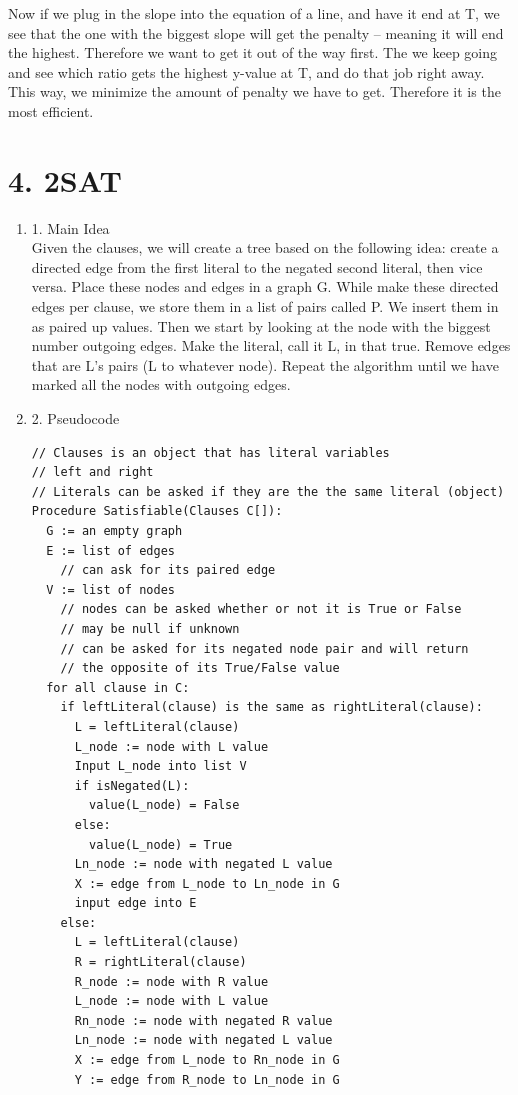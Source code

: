 \documentclass[11pt]{article}
\newenvironment{qparts}{\begin{enumerate}[{(}a{)}]}{\end{enumerate}}
\begin{document}
Now if we plug in the slope into the equation of a line, and have it end at T, we see that the one with the biggest slope will get the penalty -- meaning it will end the highest. Therefore we want to get it out of the way first. The we keep going and see which ratio gets the highest y-value at T, and do that job right away. This way, we minimize the amount of penalty we have to get. Therefore it is the most efficient. 
\newpage
\section*{4. 2SAT}
\begin{qparts}
\item[1.] Main Idea \\
Given the clauses, we will create a tree based on the following idea: create a directed edge from the first literal to the negated second literal, then vice versa. Place these nodes and edges in a graph G. While make these directed edges per clause, we store them in a list of pairs called P. We insert them in as paired up values. Then we start by looking at the node with the biggest number outgoing edges. Make the literal, call it L, in that true. Remove edges that are L's pairs (L to whatever node). Repeat the algorithm until we have marked all the nodes with outgoing edges. 
\item[2.] Pseudocode
\begin{verbatim}
// Clauses is an object that has literal variables
// left and right 
// Literals can be asked if they are the the same literal (object)
Procedure Satisfiable(Clauses C[]):
  G := an empty graph
  E := list of edges
    // can ask for its paired edge
  V := list of nodes
    // nodes can be asked whether or not it is True or False
    // may be null if unknown
    // can be asked for its negated node pair and will return
    // the opposite of its True/False value
  for all clause in C:
    if leftLiteral(clause) is the same as rightLiteral(clause):
      L = leftLiteral(clause)
      L_node := node with L value
      Input L_node into list V
      if isNegated(L):
        value(L_node) = False
      else:
        value(L_node) = True
      Ln_node := node with negated L value
      X := edge from L_node to Ln_node in G
      input edge into E
    else:
      L = leftLiteral(clause)
      R = rightLiteral(clause)
      R_node := node with R value
      L_node := node with L value
      Rn_node := node with negated R value
      Ln_node := node with negated L value
      X := edge from L_node to Rn_node in G
      Y := edge from R_node to Ln_node in G

\end{verbatim}
\end{qparts}
\end{document}
